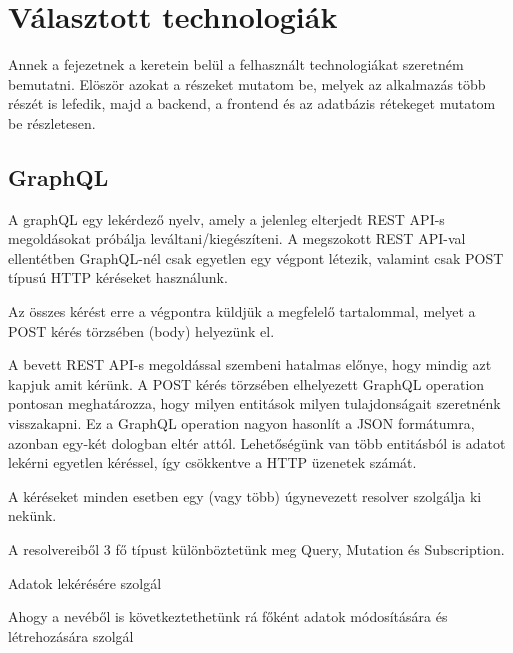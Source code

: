 \chapter{Választott technologiák}

Annek a fejezetnek a keretein belül a felhasznált technologiákat szeretném bemutatni. Elöször azokat a részeket mutatom be, melyek az alkalmazás több részét is lefedik, majd a backend, a frontend és az adatbázis rétekeget mutatom be részletesen.

\section{GraphQL}

A graphQL egy lekérdező nyelv, amely a jelenleg elterjedt REST API-s megoldásokat próbálja leváltani/kiegészíteni. A megszokott REST API-val ellentétben GraphQL-nél csak egyetlen egy végpont létezik, valamint csak POST típusú HTTP kéréseket használunk. 

Az összes kérést erre a végpontra küldjük a megfelelő tartalommal, melyet a POST kérés törzsében (body) helyezünk el.

A bevett REST API-s megoldással szembeni hatalmas előnye, hogy mindig azt kapjuk amit kérünk. A POST kérés törzsében elhelyezett GraphQL operation pontosan meghatározza, hogy milyen entitások milyen tulajdonságait szeretnénk visszakapni. Ez a GraphQL operation nagyon hasonlít a JSON formátumra, azonban egy-két dologban eltér attól. Lehetőségünk van több entitásból is adatot lekérni egyetlen kéréssel, így csökkentve a HTTP üzenetek számát.

A kéréseket minden esetben egy (vagy több) úgynevezett resolver szolgálja ki nekünk. 

A resolvereiből 3 fő típust különböztetünk meg Query, Mutation és Subscription.

\begin{definition}[Query]
  Adatok lekérésére szolgál
\end{definition}

\begin{definition}[Mutation]
  Ahogy a nevéből is következtethetünk rá főként adatok módosítására és létrehozására szolgál
\end{definition}

